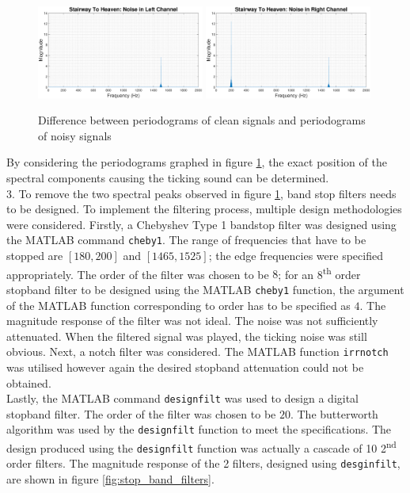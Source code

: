\documentclass{article}
\begin{document}
\begin{figure}[H]
    \centering
    \includegraphics[width=0.49\textwidth]{noise_s2h_left}
    \includegraphics[width=0.49\textwidth]{noise_s2h_right}
    \caption{Difference between periodograms of clean signals and periodograms of noisy signals}
    \label{fig:s2h_diff}
\end{figure}


By considering the periodograms graphed in figure \ref{fig:s2h_diff}, the exact position of the spectral components causing the ticking sound can be determined. \\


3. To remove the two spectral peaks observed in figure \ref{fig:s2h_diff}, band stop filters needs to be designed. To implement the filtering process, multiple design methodologies were considered. Firstly, a Chebyshev Type 1 bandstop filter was designed using the MATLAB command {\tt cheby1}. The range of frequencies that have to be stopped are $[180, 200]$ and $[1465, 1525]$; the edge frequencies were specified appropriately. The order of the filter was chosen to be $8$; for an 8\textsuperscript{th} order stopband filter to be designed using the MATLAB {\tt cheby1} function, the argument of the MATLAB function corresponding to order has to be specified as $4$. The magnitude response of the filter was not ideal. The noise was not sufficiently attenuated. When the filtered signal was played, the ticking noise was still obvious. Next, a notch filter was considered. The MATLAB function {\tt irrnotch} was utilised however again the desired stopband attenuation could not be obtained.\\ 

Lastly, the MATLAB command {\tt designfilt} was used to design a digital stopband filter. The order of the filter was chosen to be $20$. The butterworth algorithm was used by the {\tt designfilt} function to meet the specifications. The design produced using the {\tt designfilt} function was actually a cascade of 10 2\textsuperscript{nd} order filters. The magnitude response of the 2 filters, designed using {\tt desginfilt}, are shown in figure \ref{fig:stop_band_filters}.
\end{document}
